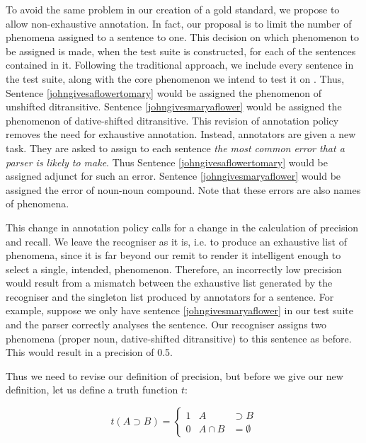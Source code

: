 \documentclass[11pt]{article}
\begin{document}
To avoid the same problem in our creation of a gold standard, we propose to allow non-exhaustive annotation. In fact, our proposal is to limit the number of phenomena assigned to a sentence to one. This decision on which phenomenon to be assigned is made, when the test suite is constructed, for each of the sentences contained in it. Following the traditional approach, we include every sentence in the test suite, along with the core phenomenon we intend to test it on \cite{lehmannandoepen1996}. %
Thus, Sentence \ref{johngivesaflowertomary} would be assigned the phenomenon of unshifted ditransitive. Sentence \ref{johngivesmaryaflower} would be assigned the phenomenon of dative-shifted ditransitive. This revision of annotation policy removes the need for exhaustive annotation. Instead, annotators are given a new task. They are asked to assign to each sentence \emph{the most common error that a parser is likely to make}.  Thus Sentence \ref{johngivesaflowertomary} would be assigned adjunct for such an error. Sentence \ref{johngivesmaryaflower} would be assigned the error of noun-noun compound. Note that these errors are also names of phenomena. 

This change in annotation policy calls for a change in the calculation of precision and recall. We leave the recogniser as it is, i.e. to produce an exhaustive list of phenomena, since it is far beyond our remit to render it intelligent enough to select a single, intended, phenomenon. Therefore, an incorrectly low precision would result from a mismatch between the exhaustive list generated by the recogniser and the singleton list produced by annotators for a sentence. %
For example, suppose we only have sentence \ref{johngivesmaryaflower} in our test suite and the parser correctly analyses the sentence. Our recogniser assigns two phenomena (proper noun, dative-shifted ditransitive) to this sentence as before. This would result in a precision of 0.5. 

Thus we need to revise our definition of precision, but before we give our new definition, let us define a truth function $t$:

\[
t(A \supset B) = \left\{ 
\begin{array}{ccc}
1 & A & \supset B  \\
0 & A \cap B & =\emptyset 
\end{array} \right.
\]
\end{document}
